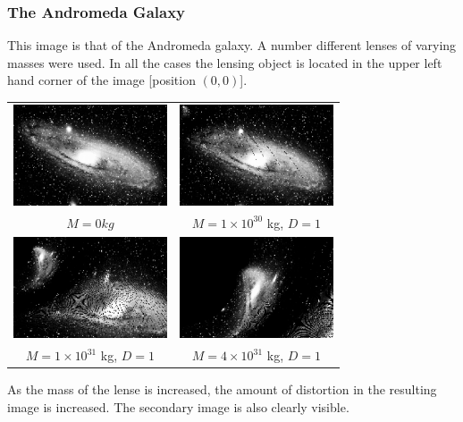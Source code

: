 \documentclass[a4paper]{IEEEtran}
\begin{document}
\newpage
\subsubsection{The Andromeda Galaxy}     
This image is that of the Andromeda galaxy. A number different lenses
of varying masses were used. In all the cases the lensing object
is located in the upper left hand corner of the image [position $(0,0)$].
\begin{center}
    \begin{tabular}{cc} 
    \includegraphics[height=3cm]{pics/andromeda.eps}  &
    \includegraphics[height=3cm]{pics/1e30and.eps}  \\
    $M = 0 kg$ & $M = 1 \times 10^{30}$ kg, $D = 1$ \\ 
    \includegraphics[height=3cm]{pics/1e31and.eps}  &
    \includegraphics[height=3cm]{pics/4e31and.eps} \\
    $M = 1 \times 10^{31}$ kg, $D = 1$ &  $M = 4 \times 10^{31}$ kg, $D = 1$ \\ 
    \end{tabular} 
\end{center}
As the mass of the lense is increased, the amount of distortion in the
resulting image is increased. The secondary image is also clearly visible.
\end{document}
